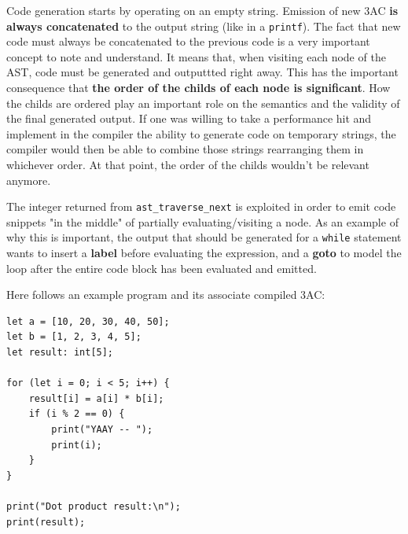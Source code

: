 \documentclass[a4paper]{article}
\begin{document}
Code generation starts by operating on an empty string. Emission of new 3AC \textbf{is always concatenated} to the output string (like in a \texttt{printf}).
The fact that new code must always be concatenated to the previous code is a very important concept to note and understand. It means
that, when visiting each node of the AST, code must be generated and outputtted right away. This has the important
consequence that \textbf{the order of the childs of each node is significant}.
How the childs are ordered play an important role on the semantics and the validity of the final generated output.
If one was willing to take a performance hit and implement in the compiler the ability to generate code on temporary strings, the compiler
would then be able to combine those strings rearranging them in whichever order. At that point, the order of the childs wouldn't be relevant anymore.

The integer returned from \texttt{ast\_traverse\_next} is exploited in order to emit code snippets "in the middle" of partially evaluating/visiting a node.
As an example of why this is important, the output that should be generated for a \texttt{while} statement wants to insert a \textbf{label} before evaluating the expression,
and a \textbf{goto} to model the loop after the entire code block has been evaluated and emitted.

Here follows an example program and its associate compiled 3AC:

\begin{lstlisting}[language=DPL]
let a = [10, 20, 30, 40, 50];
let b = [1, 2, 3, 4, 5];
let result: int[5];

for (let i = 0; i < 5; i++) {
    result[i] = a[i] * b[i];
    if (i % 2 == 0) {
        print("YAAY -- ");
        print(i);
    }
}

print("Dot product result:\n");
print(result);
\end{lstlisting}
\end{document}
